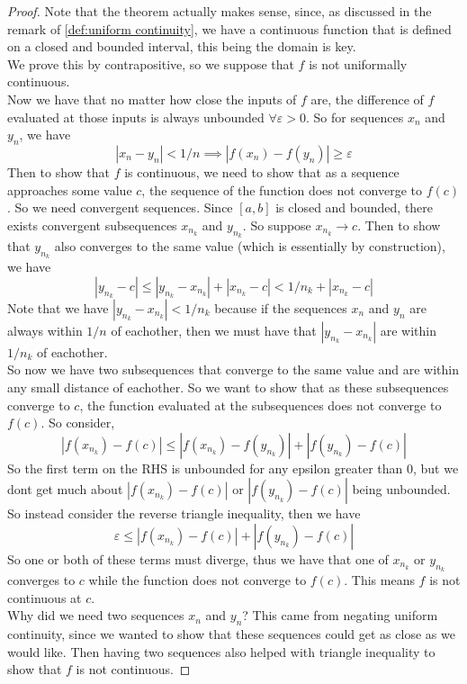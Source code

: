 \documentclass{article}
\theoremstyle{definition}
\theoremstyle{remark}
\begin{document}
\begin{proof}
Note that the theorem actually makes sense, since, as discussed in the remark of 
\ref{def:uniform continuity}, we have a continuous function that is
defined on a closed and bounded interval, this being the domain is key.\\
We prove this by contrapositive, so we suppose that $f$ is not uniformally continuous. \\
Now we have that no matter how close the inputs of $f$ are, the difference of $f$ evaluated 
at those inputs is always unbounded $\forall \varepsilon > 0$. So for sequences $x_n$ and $y_n$, we have
\[
|x_n - y_n| < 1/n \implies |f(x_n) - f(y_n) | \geq \varepsilon
\]
Then to show that $f$ is continuous, we need to show that as a sequence approaches 
some value $c$, the sequence of the function does not converge to $f(c)$. So we need
convergent sequences. Since $[a,b]$ is closed and bounded, there exists convergent 
subsequences $x_{n_k}$ and $y_{n_k}$. So suppose $x_{n_k} \to c$. Then to show 
that $y_{n_k}$ also converges to the same value (which is essentially by construction), we have
\[
|y_{n_k} - c| \leq |y_{n_k} - x_{n_k}| + |x_{n_k} - c| < 1/n_k + |x_{n_k} - c|
\]
Note that we have $|y_{n_k} - x_{n_k}| < 1/n_k$ because if the sequences $x_n$ and $y_n$ are always 
within $1/n$ of eachother, then we must have that $|y_{n_k} - x_{n_k}|$ are within $1/n_k$ of eachother.\\
So now we have two subsequences that converge to the same value and are within any small distance of eachother. 
So we want to show that as these subsequences converge to $c$, the function evaluated at the subsequences
does not converge to $f(c)$. So consider, 
\[
|f(x_{n_k}) - f(c)| \leq |f(x_{n_k}) - f(y_{n_k})| + |f(y_{n_k}) - f(c)|
\]
So the first term on the RHS is unbounded for any epsilon greater than 0, but we dont get 
much about $|f(x_{n_k}) - f(c)|$ or $|f(y_{n_k}) - f(c)|$ being unbounded. So instead 
consider the reverse triangle inequality, then we have \[
\varepsilon \leq |f(x_{n_k}) - f(c)| + |f(y_{n_k}) - f(c)|
\]
So one or both of these terms must diverge, thus we have that one of $x_{n_k}$ or $y_{n_k}$ converges
to $c$ while the function does not converge to $f(c)$. This means $f$ is not continuous at $c$. \\
Why did we need two sequences $x_n$ and $y_n$? This came from negating uniform continuity, since 
we wanted to show that these sequences could get as close as we would like. Then having two sequences also helped 
with triangle inequality to show that $f$ is not continuous. 
\end{proof}
\end{document}
